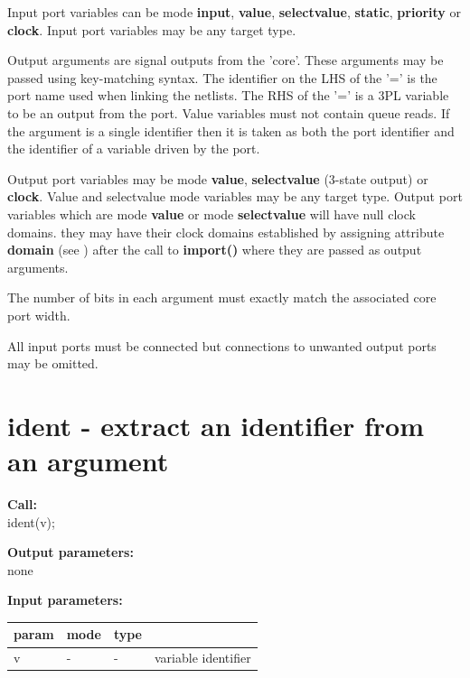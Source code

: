         Input port variables can be mode {\bf input}, {\bf value}, {\bf
        selectvalue}, {\bf static}, {\bf priority} or {\bf clock}. Input port
        variables may be any target type.
        
        Output arguments are signal outputs from the 'core'. These arguments may
        be passed using key-matching syntax. The identifier on the LHS of the
        '=' is the port name used when linking the netlists. The RHS of the '='
        is a 3PL variable to be an output from the port. Value variables must
        not contain queue reads. If the argument is a single identifier then it
        is taken as both the port identifier and the identifier of a variable
        driven by the port.    
        
        Output port variables may be mode {\bf value}, {\bf selectvalue}
        (3-state output) or {\bf clock}. Value and selectvalue mode variables
        may be any target type. Output port variables which are mode {\bf value}
        or mode {\bf selectvalue} will have null clock domains. they may have
        their clock domains established by assigning attribute {\bf domain} (see
        ) after the call to {\bf import()} where they
        are passed as output arguments.
        
        The number of bits in each argument must exactly match the associated
        core port width.

        All input ports must be connected but connections to unwanted output
        ports may be omitted.
        
        
        
        
        
        
        
    \section{ident - extract an identifier from an argument}\label{sec:ipident}
        
        {\bf Call:} \\
        ident(v);
        
        {\bf Output parameters:} \\
        none
        
        {\bf Input parameters:} \\
        \begin{tabular}{| l | l | l | l |}
        \hline
        param  & mode & type & \\
        \hline \hline
        v & - &  -  & variable identifier   \\ \hline
        \end{tabular}
        
